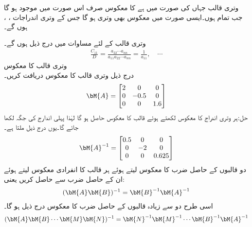 وتری قالب  جہاں  کی صورت میں  ہے  کا معکوس صرف اس صورت میں موجود ہو گا جب تمام  ہوں۔ایسی صورت میں معکوس  بھی وتری ہو گا جس کے وتری اندراجات ، ،  ہوں گے۔

وتری قالب کے لئے مساوات  میں درج ذیل ہوں گے۔
\begin{align*}
\frac{C_{11}}{D}=\frac{a_{22}\cdots a_{nn}}{a_{11}a_{22}\cdots a_{nn}}=\frac{1}{a_{11}}, \quad \cdots
\end{align*}
\quad وتری قالب کا معکوس\\
درج ذیل وتری قالب کا معکوس دریافت کریں۔
\begin{align*}
\bM{A}=
\begin{bmatrix}
2&0&0\\
0&-0.5&0\\
0&0&1.6
\end{bmatrix}
\end{align*}
حل:ہر وتری اندراج کا معکوس لکھتے ہوئے قالب کا معکوس حاصل ہو گا لہٰذا پہلی اندارج  کی جگہ  لکھا جائے گا۔یوں درج ذیل ملتا ہے۔
\begin{align*}
\bM{A}^{-1}=
\begin{bmatrix}
0.5&0&0\\
0&-2&0\\
0&0&0.625
\end{bmatrix}
\end{align*}
دو  قالبوں کے حاصل ضرب کا معکوس لیتے ہوئے ہر قالب کا انفرادی معکوس لیتے ہوئے ان کے حاصل ضرب  سے حاصل کریں  یعنی:
\begin{align}\label{مساوات_الجبرا_ضرب_قالب_معکوس_الف}
(\bM{A}\bM{B})^{-1}=\bM{B}^{-1}\bM{A}^{-1}
\end{align}
اسی طرح دو سے زیادہ قالبوں کے حاصل ضرب کا معکوس درج ذیل ہو گا۔
\begin{align}\label{مساوات_الجبرا_ضرب_قالب_معکوس_ب}
(\bM{A}\bM{B}\cdots \bM{M}\bM{N})^{-1}=\bM{N}^{-1}\bM{M}^{-1}\cdots\bM{B}^{-1}\bM{A}^{-1}
\end{align}

